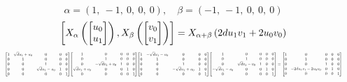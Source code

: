 \documentclass[11pt]{article}
\theoremstyle{definition}
\begin{document}
\[
\alpha = \left( 1, \  -1, \  0, \  0, \  0\right), \quad \beta = \left( -1, \  -1, \  0, \  0, \  0\right)
\]
\[
\scaletoalign{\textwidth}{\left[ X_{\alpha}\left(\left[\begin{matrix}u_{0}\\u_{1}\end{matrix}\right]\right), X_{\beta}\left(\left[\begin{matrix}v_{0}\\v_{1}\end{matrix}\right]\right) \right] = X_{\alpha + \beta}\left(2 d u_{1} v_{1} + 2 u_{0} v_{0}\right)}
\]
\[
\scaletoalign{\textwidth}{{\left[\begin{matrix}1 & \sqrt{d} u_{1} + u_{0} & 0 & 0 & 0\\0 & 1 & 0 & 0 & 0\\0 & 0 & 1 & 0 & 0\\0 & 0 & \sqrt{d} u_{1} - u_{0} & 1 & 0\\0 & 0 & 0 & 0 & 1\end{matrix}\right]} {\left[\begin{matrix}1 & 0 & 0 & 0 & 0\\0 & 1 & 0 & 0 & 0\\0 & - \sqrt{d} v_{1} + v_{0} & 1 & 0 & 0\\\sqrt{d} v_{1} + v_{0} & 0 & 0 & 1 & 0\\0 & 0 & 0 & 0 & 1\end{matrix}\right]} {\left[\begin{matrix}1 & - \sqrt{d} u_{1} - u_{0} & 0 & 0 & 0\\0 & 1 & 0 & 0 & 0\\0 & 0 & 1 & 0 & 0\\0 & 0 & - \sqrt{d} u_{1} + u_{0} & 1 & 0\\0 & 0 & 0 & 0 & 1\end{matrix}\right]} {\left[\begin{matrix}1 & 0 & 0 & 0 & 0\\0 & 1 & 0 & 0 & 0\\0 & \sqrt{d} v_{1} - v_{0} & 1 & 0 & 0\\- \sqrt{d} v_{1} - v_{0} & 0 & 0 & 1 & 0\\0 & 0 & 0 & 0 & 1\end{matrix}\right]} = {\left[\begin{matrix}1 & 0 & 0 & 0 & 0\\0 & 1 & 0 & 0 & 0\\0 & 0 & 1 & 0 & 0\\0 & - 2 d u_{1} v_{1} - 2 u_{0} v_{0} & 0 & 1 & 0\\0 & 0 & 0 & 0 & 1\end{matrix}\right]}}
\]
\end{document}

